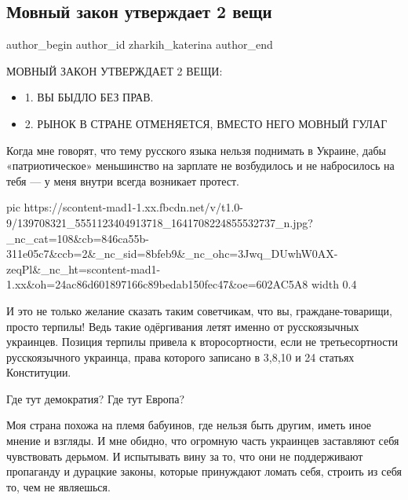  
 
 
 
 
\subsection{Мовный закон утверждает 2 вещи}
\label{sec:18_01_2021.fb.zharkih_katerina.1.mova_terpily}
\ifcmt
  author_begin
   author_id zharkih_katerina
  author_end
\fi


МОВНЫЙ ЗАКОН УТВЕРЖДАЕТ 2 ВЕЩИ:

\begin{itemize}
\item 1. ВЫ БЫДЛО БЕЗ ПРАВ. 
\item 2. РЫНОК В СТРАНЕ ОТМЕНЯЕТСЯ, ВМЕСТО НЕГО МОВНЫЙ ГУЛАГ 
\end{itemize}

Когда мне говорят, что тему русского языка нельзя поднимать в Украине, дабы
«патриотическое» меньшинство на зарплате не возбудилось и не набросилось на
тебя — у меня внутри всегда возникает протест. 

\ifcmt
  pic https://scontent-mad1-1.xx.fbcdn.net/v/t1.0-9/139708321_5551123404913718_1641708224855532737_n.jpg?_nc_cat=108&cb=846ca55b-311e05c7&ccb=2&_nc_sid=8bfeb9&_nc_ohc=3Jwq_DUwhW0AX-zeqPl&_nc_ht=scontent-mad1-1.xx&oh=24ac86d601897166c89bedab150fec47&oe=602AC5A8
  width 0.4
\fi


И это не только желание сказать таким советчикам, что вы, граждане-товарищи,
просто терпилы! Ведь такие одёргивания летят именно от русскоязычных украинцев.
Позиция терпилы привела к второсортности, если не третьесортности
русскоязычного украинца, права которого записано в 3,8,10 и 24 статьях
Конституции. 

Где тут демократия? Где тут Европа? 

Моя страна похожа на племя бабуинов, где нельзя быть другим, иметь иное мнение
и взгляды. И мне обидно, что огромную часть украинцев заставляют себя
чувствовать дерьмом. И испытывать вину за то, что они не поддерживают
пропаганду и дурацкие законы, которые принуждают ломать себя, строить из себя
то, чем не являешься. 

